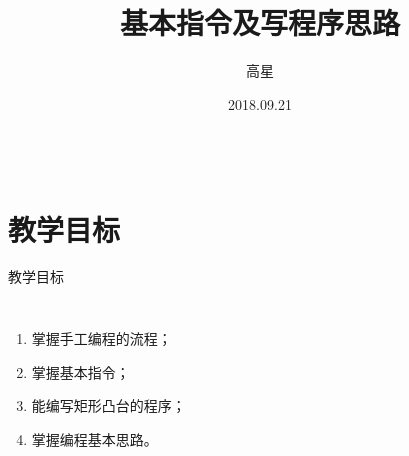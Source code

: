\documentclass[UTF8,zihao=-4]{ctexbeamer}
\title{基本指令及写程序思路}
\author{高星}
\institute{湖南潇湘技师学院~湖南九嶷职院}
\date{2018.09.21}
\begin{document}
    
\begin{frame}[plain]
		\maketitle
\end{frame}

\begin{frame}
\begin{columns}
\tableofcontents[hideallsubsections]
\end{columns}
\end{frame}

\section*{教学目标}

\begin{frame}{教学目标}
    \begin{columns}
        \begin{enumerate}
            \item 掌握手工编程的流程；
            \item 掌握基本指令；
            \item 能编写矩形凸台的程序；
            \item 掌握编程基本思路。
        \end{enumerate}
    \end{columns}
\end{frame}
\end{document}
